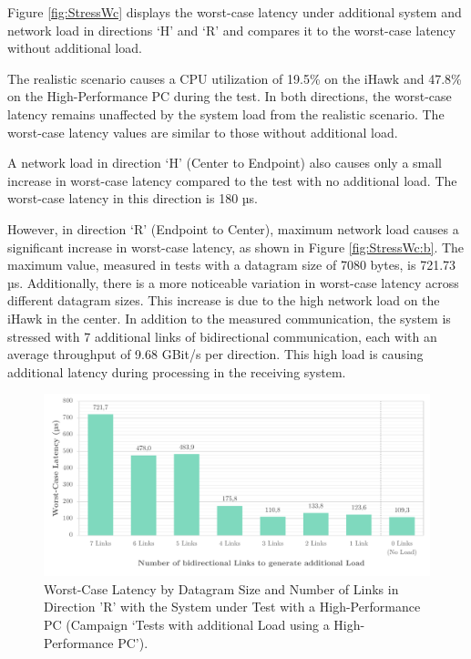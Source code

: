 Figure \ref{fig:StressWc} displays the worst-case latency under additional system and network load in directions `H' and `R' and compares it to the worst-case latency without additional load.

The realistic scenario causes a CPU utilization of 19.5\% on the iHawk and 47.8\% on the High-Performance PC during the test. In both directions, the worst-case latency remains unaffected by the system load from the realistic scenario. The worst-case latency values are similar to those without additional load.

A network load in direction `H' (Center to Endpoint) also causes only a small increase in worst-case latency compared to the test with no additional load. The worst-case latency in this direction is 180 µs.

However, in direction `R' (Endpoint to Center), maximum network load causes a significant increase in worst-case latency, as shown in Figure \ref{fig:StressWc:b}. The maximum value, measured in tests with a datagram size of 7080 bytes, is 721.73 µs. Additionally, there is a more noticeable variation in worst-case latency across different datagram sizes. This increase is due to the high network load on the iHawk in the center. In addition to the measured communication, the system is stressed with 7 additional links of bidirectional communication, each with an average throughput of 9.68 GBit/s per direction. This high load is causing additional latency during processing in the receiving system.

\begin{figure}[h!]
    \centering
    \includegraphics[width=1\linewidth]{figures/performance/d_13.pdf}
    \caption{Worst-Case Latency by Datagram Size and Number of Links in Direction 'R' with the System under Test with a High-Performance PC (Campaign `Tests with additional Load using a High-Performance PC').}
    \label{fig:NetLoadLinkReduction}
\end{figure}


